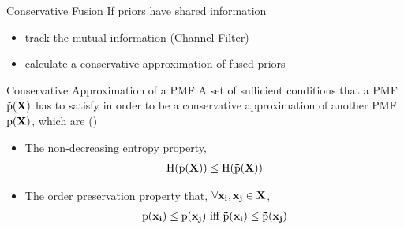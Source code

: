 \documentclass{beamer}
\newcommand{\vect}{\bf}
\theoremstyle{remark}
\newcommand{\pr}{\textrm{p}}
\begin{document}

\begin{frame}{Conservative Fusion}
	If priors have shared information
	\begin{itemize}
		\item {\color{blue}track the mutual information} (Channel Filter)
		\item {\color{blue}calculate a conservative approximation of fused priors}
	\end{itemize}
	\begin{exampleblock}{Conservative Approximation of a PMF}
	A set of sufficient conditions that a PMF $\tilde{\pr}(\vect{X})$ has to satisfy in order to be a conservative approximation of another PMF $\pr(\vect{X})$, which are ({\color{olive}\cite{bailey2012conservative}})
	\begin{itemize}
		\item {\color{red}The non-decreasing entropy property},
		$$\begin{aligned}
		\text{H}(\pr(\vect{X})) \leq \text{H}(\tilde{\pr}(\vect{X}))
		\end{aligned}$$
		\item {\color{red}The order preservation property that}, $\forall \vect{x}_i,\vect{x}_j\in\vect{X}$,
		$$\begin{aligned}
		\pr(\vect{x}_i) \leq \pr(\vect{x}_j) \ \text{iff}\  \tilde{\pr}(\vect{x}_i) \leq \tilde{\pr}(\vect{x}_j) 
		\end{aligned}$$
	\end{itemize}
	\end{exampleblock}
\end{frame}
\end{document}
